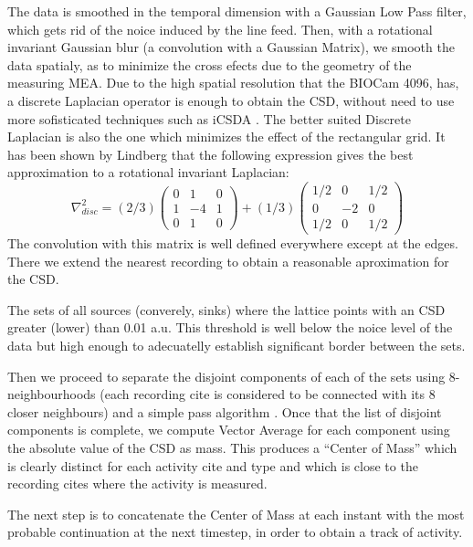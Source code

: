\documentclass{article}
\begin{document}
The data is smoothed in the temporal dimension 
 with a Gaussian Low Pass filter, which
gets rid of the noice induced by the line feed. Then,  with a rotational
invariant Gaussian blur (a convolution with a Gaussian Matrix), we
smooth the data spatialy, as to minimize the cross efects due to the 
geometry of the measuring MEA. Due to the high spatial resolution 
that the BIOCam 4096, has, a discrete Laplacian operator is enough to
obtain the CSD, without need to use more sofisticated techniques such as
iCSDA \cite{Leski2011}. The better suited Discrete Laplacian is also the
one which minimizes the effect of the rectangular grid. It has been shown
by Lindberg \cite{Lindberg90} that the following expression gives the 
best approximation to a rotational invariant Laplacian:
\begin{equation}
\nabla^2_{disc}=(2/3)\begin{pmatrix}
0 & 1 & 0 \\
1 & -4 & 1 \\
0 & 1 & 0 
\end{pmatrix}+(1/3)
\begin{pmatrix}
1/2 & 0 & 1/2 \\
0 & -2 & 0 \\
1/2 & 0 & 1/2
\end{pmatrix} 
\end{equation}
The convolution with this matrix is well defined everywhere except at the
edges. There  we extend the nearest recording to obtain a reasonable 
aproximation for the CSD. 

The sets of all sources (converely, sinks) where the lattice points
with an CSD greater (lower) than 0.01 a.u. This threshold is 
well below the noice level of the data but high enough to adecuatelly
establish significant border between the sets.

Then we proceed to separate the disjoint components of each of the sets
using 8-neighbourhoods (each recording cite is considered to be connected
with its 8 closer neighbours) and a simple pass algorithm 
\cite{Vincent91}. Once that the list of disjoint components is complete,
we compute Vector Average for each component using the absolute value
of the CSD as mass. This produces a ``Center of Mass'' which is clearly
distinct for each activity cite and type and which is close to the
recording cites where the activity is measured. 

The next step is to concatenate the Center of Mass at each instant with
the most probable continuation at the next timestep, in order to obtain
a track of activity. 




\end{document}
